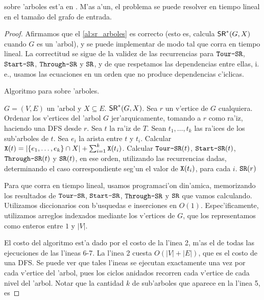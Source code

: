 \begin{theorem}
 sobre 'arboles est'a en . M'as a'un, el problema se puede resolver en tiempo lineal en el tama\~no del grafo de entrada.

\begin{proof}
Afirmamos que el \autoref{al:sr_arboles} es correcto (esto es, calcula $\textnormal{\textsf{SR}}^*(G, X)$ cuando $G$ es un 'arbol), y se puede implementar de modo tal que corra en tiempo lineal. La correctitud se sigue de la validez de las recurrencias para $\texttt{Tour-SR}$, $\texttt{Start-SR}$, $\texttt{Through-SR}$ y $\texttt{SR}$, y de que respetamos las dependencias entre ellas, i. e., usamos las ecuaciones en un orden que no produce dependencias c'iclicas.

\begin{algorithm}
  \caption{Algoritmo para  sobre 'arboles.}
  \label{al:sr_arboles}
  \begin{algorithmic}[1]
  	\Require $G = (V, E)$ un 'arbol y $X \subseteq E$.
  	\Ensure $\textnormal{\textsf{SR}}^*(G, X)$.
  	\State Sea $r$ un v'ertice de $G$ cualquiera.
  	\State Ordenar los v'ertices del 'arbol $G$ jer'arquicamente, tomando a $r$ como ra'iz, haciendo una DFS desde $r$.
			\State Sea $t$ la ra'iz de $T$. Sean $t_1, \dots, t_k$ las ra'ices de los sub'arboles de $t$. Sea $e_i$ la arista entre $t$ y $t_i$.
			\State Calcular $\texttt{X}(t) = |\{e_1, \dots, e_k\} \cap X| + \sum_{i = 1}^k \texttt{X}(t_i)$.	
			\State Calcular $\texttt{Tour-SR}(t)$, $\texttt{Start-SR}(t)$, $\texttt{Through-SR}(t)$ y $\texttt{SR}(t)$, en ese orden, utilizando las recurrencias dadas, determinando el caso correspondiente seg'un el valor de $\texttt{X}(t_i)$, para cada $i$.
		\EndFor	
	\EndFor	
	\Return $\texttt{SR}(r)$
  \end{algorithmic}
\end{algorithm}

Para que corra en tiempo lineal, usamos programaci'on din'amica, memorizando los resultados de $\texttt{Tour-SR}$, $\texttt{Start-SR}$, $\texttt{Through-SR}$ y $\texttt{SR}$ que vamos calculando. Utilizamos diccionarios con b'usquedas e inserciones en $O(1)$. Espec'ificamente, utilizamos arreglos indexados mediante los v'ertices de $G$, que los representamos como enteros entre $1$ y $|V|$.

El costo del algoritmo est'a dado por el costo de la l'inea 2, m'as el de todas las ejecuciones de las l'ineas 6-7. La l'inea 2 cuesta $O(|V| + |E|)$, que es el costo de una DFS. Se puede ver que tales l'ineas se ejecutan exactamente una vez por cada v'ertice del 'arbol, pues los ciclos anidados recorren cada v'ertice de cada nivel del 'arbol. Notar que la cantidad $k$ de sub'arboles que aparece en la l'inea 5, es


\end{proof}
\end{theorem}
